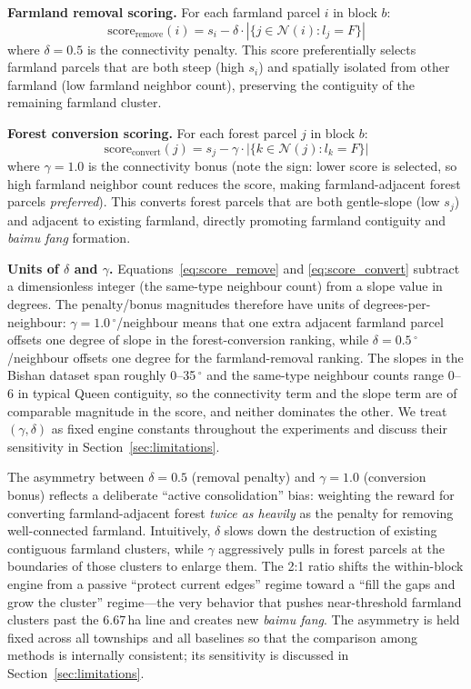 \documentclass[preprint,12pt]{elsarticle}
\begin{document}
\textbf{Farmland removal scoring.} For each farmland parcel $i$ in block $b$:
\begin{equation}
\text{score}_{\text{remove}}(i) = s_i - \delta \cdot |\{j \in \mathcal{N}(i) : l_j = F\}|
\label{eq:score_remove}
\end{equation}
where $\delta = 0.5$ is the connectivity penalty. This score preferentially selects farmland parcels that are both steep (high $s_i$) and spatially isolated from other farmland (low farmland neighbor count), preserving the contiguity of the remaining farmland cluster.

\textbf{Forest conversion scoring.} For each forest parcel $j$ in block $b$:
\begin{equation}
\text{score}_{\text{convert}}(j) = s_j - \gamma \cdot |\{k \in \mathcal{N}(j) : l_k = F\}|
\label{eq:score_convert}
\end{equation}
where $\gamma = 1.0$ is the connectivity bonus (note the sign: lower score is selected, so high farmland neighbor count reduces the score, making farmland-adjacent forest parcels \textit{preferred}). This converts forest parcels that are both gentle-slope (low $s_j$) and adjacent to existing farmland, directly promoting farmland contiguity and \textit{baimu fang} formation.

\textbf{Units of $\delta$ and $\gamma$.} Equations~\ref{eq:score_remove} and \ref{eq:score_convert} subtract a dimensionless integer (the same-type neighbour count) from a slope value in degrees. The penalty/bonus magnitudes therefore have units of degrees-per-neighbour: $\gamma=1.0\,^\circ$/neighbour means that one extra adjacent farmland parcel offsets one degree of slope in the forest-conversion ranking, while $\delta=0.5\,^\circ$/neighbour offsets one degree for the farmland-removal ranking. The slopes in the Bishan dataset span roughly 0--35\,$^\circ$ and the same-type neighbour counts range 0--6 in typical Queen contiguity, so the connectivity term and the slope term are of comparable magnitude in the score, and neither dominates the other. We treat $(\gamma,\delta)$ as fixed engine constants throughout the experiments and discuss their sensitivity in Section~\ref{sec:limitations}.

The asymmetry between $\delta = 0.5$ (removal penalty) and $\gamma = 1.0$ (conversion bonus) reflects a deliberate ``active consolidation'' bias: weighting the reward for converting farmland-adjacent forest \textit{twice as heavily} as the penalty for removing well-connected farmland. Intuitively, $\delta$ slows down the destruction of existing contiguous farmland clusters, while $\gamma$ aggressively pulls in forest parcels at the boundaries of those clusters to enlarge them. The 2:1 ratio shifts the within-block engine from a passive ``protect current edges'' regime toward a ``fill the gaps and grow the cluster'' regime---the very behavior that pushes near-threshold farmland clusters past the 6.67\,ha line and creates new \textit{baimu fang}. The asymmetry is held fixed across all townships and all baselines so that the comparison among methods is internally consistent; its sensitivity is discussed in Section~\ref{sec:limitations}.
\end{document}
